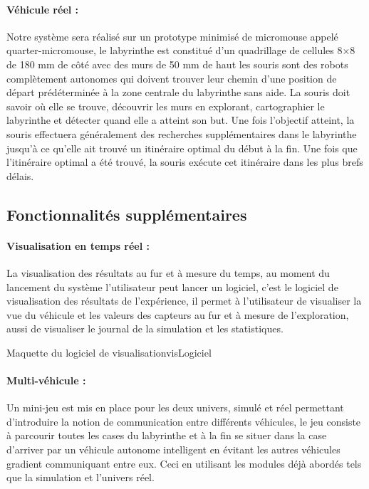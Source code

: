 \paragraph{Véhicule réel :}Notre système sera réalisé sur un prototype minimisé 
de micromouse appelé quarter-micromouse, le labyrinthe est constitué d'un quadrillage 
de cellules 8×8 de 180 mm de côté avec des murs de 50 mm de haut les souris sont des 
robots complètement autonomes qui doivent trouver leur chemin d'une position de départ 
prédéterminée à la zone centrale du labyrinthe sans aide. La souris doit savoir où elle 
se trouve, découvrir les murs en explorant, cartographier le labyrinthe et détecter quand 
elle a atteint son but. Une fois l'objectif atteint, la souris effectuera généralement des 
recherches supplémentaires dans le labyrinthe jusqu'à ce qu'elle ait trouvé un itinéraire 
optimal du début à la fin. Une fois que l'itinéraire optimal a été trouvé, la souris exécute 
cet itinéraire dans les plus brefs délais. 


\subsection{Fonctionnalités supplémentaires} \label{sec:foncSupplementaires}

\paragraph{Visualisation en temps réel :}La visualisation des résultats au fur et à mesure 
du temps, au moment du lancement du système l'utilisateur peut lancer un logiciel, c'est le 
logiciel de visualisation des résultats de l'expérience, il permet à l'utilisateur de visualiser 
la vue du véhicule et les valeurs des capteurs au fur et à mesure de l'exploration, aussi de 
visualiser le journal de la simulation et les statistiques.

{Maquette du logiciel de visualisation}{visLogiciel}

\paragraph{Multi-véhicule :} Un mini-jeu est mis en place pour les 
deux univers, simulé et réel permettant d'introduire la notion de communication 
entre différents véhicules, le jeu consiste à parcourir toutes les cases du 
labyrinthe et à la fin se situer dans la case d'arriver par un véhicule autonome 
intelligent en évitant les autres véhicules gradient communiquant entre eux. 
Ceci en utilisant les modules déjà abordés tels que la simulation et l'univers réel.

